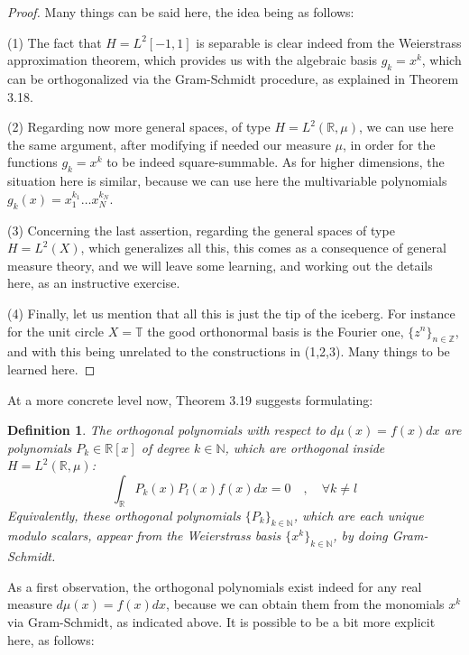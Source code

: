\documentclass[12pt]{amsbook}
\newtheorem{definition}[theorem]{Definition}
\begin{document}
\begin{proof}
Many things can be said here, the idea being as follows:

\medskip

(1) The fact that $H=L^2[-1,1]$ is separable is clear indeed from the Weierstrass approximation theorem, which provides us with the algebraic basis $g_k=x^k$, which can be orthogonalized via the Gram-Schmidt procedure, as explained in Theorem 3.18.

\medskip

(2) Regarding now more general spaces, of type $H=L^2(\mathbb R,\mu)$, we can use here the same argument, after modifying if needed our measure $\mu$, in order for the functions $g_k=x^k$ to be indeed square-summable. As for higher dimensions, the situation here is similar, because we can use here the multivariable polynomials $g_k(x)=x_1^{k_1}\ldots x_N^{k_N}$.

\medskip

(3) Concerning the last assertion, regarding the general spaces of type $H=L^2(X)$, which generalizes all this, this comes as a consequence of general measure theory, and we will leave some learning, and working out the details here, as an instructive exercise.

\medskip

(4) Finally, let us mention that all this is just the tip of the iceberg. For instance for the unit circle $X=\mathbb T$ the good orthonormal basis is the Fourier one, $\{z^n\}_{n\in\mathbb Z}$, and with this being unrelated to the constructions in (1,2,3). Many things to be learned here.
\end{proof}

At a more concrete level now, Theorem 3.19 suggests formulating:


\begin{definition}
The orthogonal polynomials with respect to $d\mu(x)=f(x)dx$ are polynomials $P_k\in\mathbb R[x]$ of degree $k\in\mathbb N$, which are orthogonal inside $H=L^2(\mathbb R,\mu)$:
$$\int_\mathbb RP_k(x)P_l(x)f(x)dx=0\quad,\quad\forall k\neq l$$
Equivalently, these orthogonal polynomials $\{P_k\}_{k\in\mathbb N}$, which are each unique modulo scalars, appear from the Weierstrass basis $\{x^k\}_{k\in\mathbb N}$, by doing Gram-Schmidt.
\end{definition}

As a first observation, the orthogonal polynomials exist indeed for any real measure $d\mu(x)=f(x)dx$, because we can obtain them from the monomials $x^k$ via Gram-Schmidt, as indicated above. It is possible to be a bit more explicit here, as follows:
\end{document}
